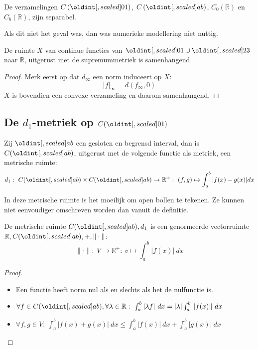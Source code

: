 \documentclass[main.tex]{subfiles}
\begin{document}
\begin{vb}
  De verzamelingen $C\left(\interval{0}{1}\right)$, $C\left(\interval{a}{b}\right)$, $C_{0}\left(\mathbb{R}\right)$ en $C_{b}\left(\mathbb{R}\right)$, zijn separabel.
\end{vb}

\begin{opm}
  Als dit niet het geval was, dan was numerieke modellering niet nuttig.
\end{opm}

\begin{vb}
  De ruimte $X$ van continue functies van $\interval{0}{1} \cup \interval{2}{3}$ naar $\mathbb{R}$, uitgerust met de supremummetriek is samenhangend.

  \begin{proof}
    Merk eerst op dat $d_{\infty}$ een norm induceert op $X$:
    \[ |f|_{\infty} = d(f_{\infty},0) \]
    $X$ is bovendien een convexe verzameling en daarom samenhangend.
  \end{proof}
\end{vb}


\subsection{De $d_1$-metriek op $C(\interval{0}{1})$}
\label{sec:de-d_1-metriek}

\begin{vb}
  Zij $\interval{a}{b}$ een gesloten en begrensd interval, dan is $C(\interval{a}{b})$, uitgerust met de volgende functie als metriek, een metrische ruimte:
  \[ d_{1}:\ C(\interval{a}{b})\times C(\interval{a}{b}) \rightarrow \mathbb{R}^{+}:\ (f,g) \mapsto \int_{a}^{b}|f(x)-g(x)|dx \]
\end{vb}

\begin{opm}
  In deze metrische ruimte is het moeilijk om open bollen te tekenen.
  Ze kunnen niet eenvoudiger omschreven worden dan vanuit de definitie.
\end{opm}

\begin{vb}
  De metrische ruimte $C(\interval{a}{b}),d_{1}$ is een genormeerde vectorruimte $\mathbb{R},C(\interval{a}{b}),+,\Vert\cdot\Vert$:
  \[ \|\cdot\|:\ V \rightarrow \mathbb{R}^{+}:\ v \mapsto \int_{a}^{b}\left|f(x)\right|\ dx \]

  \begin{proof}
    \noindent
    \begin{itemize}
    \item Een functie heeft norm nul als en slechts als het de nulfunctie is.
    \item $\forall f\in C(\interval{a}{b}), \forall \lambda \in \mathbb{R}:\ \int_{a}^{b}|\lambda f|\ dx = |\lambda|\int_{a}^{b}\|f(x)\|\ dx$
    \item $\forall f,g\in V:\ \int_{a}^{b}|f(x)+g(x)|\ dx \le \int_{a}^{b}|f(x)|\ dx + \int_{a}^{b}|g(x)|\ dx$
    \end{itemize}
  \end{proof}
\end{vb}
\end{document}
